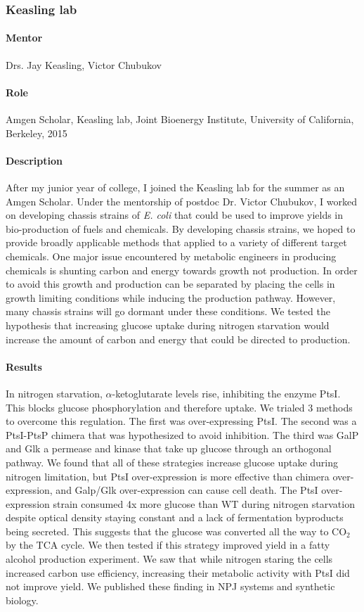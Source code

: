 \documentclass[11pt]{article}
\begin{document}
\subsubsection{Keasling lab}
\begin{refsection}
%
\paragraph{Mentor}
Drs. Jay Keasling, Victor Chubukov
%
\paragraph{Role}
Amgen Scholar, Keasling lab, Joint Bioenergy Institute, University of California, Berkeley, 2015
%
\paragraph{Description}
After my junior year of college, I joined the Keasling lab for the summer as an Amgen Scholar.
Under the mentorship of postdoc Dr. Victor Chubukov, I worked on developing chassis strains of \textit{E. coli} that could be used to improve yields in bio-production of fuels and chemicals.
By developing chassis strains, we hoped to provide broadly applicable methods that applied to a variety of different target chemicals.
One major issue encountered by metabolic engineers in producing chemicals is shunting carbon and energy towards growth not production. 
In order to avoid this growth and production can be separated by placing the cells in growth limiting conditions while inducing the production pathway.
However, many chassis strains will go dormant under these conditions.
We tested the hypothesis that increasing glucose uptake during nitrogen starvation would increase the amount of carbon and energy that could be directed to production.
%
\paragraph{Results}
In nitrogen starvation, $\alpha$-ketoglutarate levels rise, inhibiting the enzyme PtsI.
This blocks glucose phosphorylation and therefore uptake.
We trialed 3 methods to overcome this regulation.
The first was over-expressing PtsI.
The second was a PtsI-PtsP chimera that was hypothesized to avoid inhibition.
The third was GalP and Glk a permease and kinase that take up glucose through an orthogonal pathway.
We found that all of these strategies increase glucose uptake during nitrogen limitation, but PtsI over-expression is more effective than chimera over-expression, and Galp/Glk over-expression can cause cell death.
The PtsI over-expression strain consumed 4x more glucose than WT during nitrogen starvation despite optical density staying constant and a lack of fermentation byproducts being secreted.
This suggests that the glucose was converted all the way to CO$_2$ by the TCA cycle.
We then tested if this strategy improved yield in a fatty alcohol production experiment.
We saw that while nitrogen staring the cells increased carbon use efficiency, increasing their metabolic activity with PtsI did not improve yield.
We published these finding in NPJ systems and synthetic biology.
%
\nocite{Chubukov2017-uu}
\printbibliography[heading=none]
\end{refsection}
%
\end{document}
